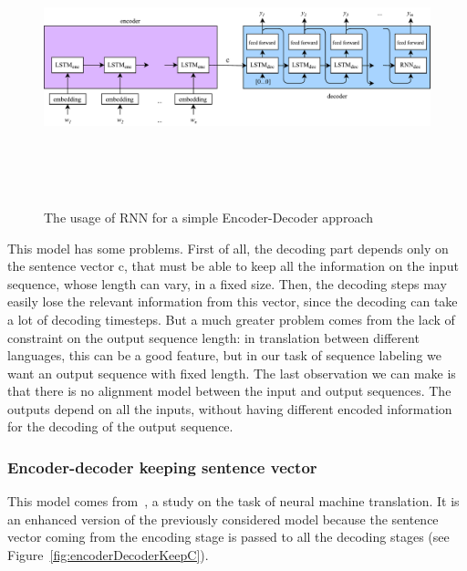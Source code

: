 \begin{figure}[!htbp]
    \centering
    \includegraphics[max width=\linewidth,max height=8cm,keepaspectratio]{figures/encoderDecoderRNN}
    \caption{The usage of RNN for a simple Encoder-Decoder approach}\label{fig:encoderDecoderRNN}
\end{figure}

This model has some problems. First of all, the decoding part depends only on the sentence vector c, that must be able to keep all the information on the input sequence, whose length can vary, in a fixed size. Then, the decoding steps may easily lose the relevant information from this vector, since the decoding can take a lot of decoding timesteps. But a much greater problem comes from the lack of constraint on the output sequence length: in translation between different languages, this can be a good feature, but in our task of sequence labeling we want an output sequence with fixed length. The last observation we can make is that there is no alignment model between the input and output sequences. The outputs depend on all the inputs, without having different encoded information for the decoding of the output sequence.

\subsubsection{Encoder-decoder keeping sentence vector}
This model comes from~\cite{cho2014learning}, a study on the task of neural machine translation. It is an enhanced version of the previously considered model because the sentence vector coming from the encoding stage is passed to all the decoding stages (see Figure~\ref{fig:encoderDecoderKeepC}).

